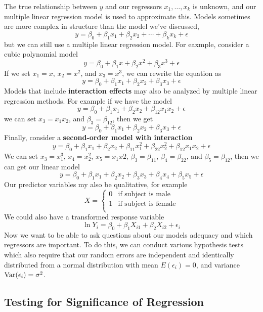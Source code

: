 The true relationship between $y$ and our regressors $x_1,\ldots, x_k$ is unknown, and our multiple linear regression model is used to approximate this. Models sometimes are more complex in structure than the model we've discussed, 
\[y = \beta_0 + \beta_1x_1 + \beta_2x_2 + \cdots + \beta_kx_k + \epsilon\]
but we can still use a multiple linear regression model. For eaxmple, consider a cubic polynomial model 
\[y = \beta_0 + \beta_1x + \beta_2x^2 + \beta_3x^3 + \epsilon\]
If we set $x_1 = x$, $x_2 = x^2$, and $x_3 = x^3$, we can rewrite the equation as 
\[y = \beta_0 + \beta_1x_1 + \beta_2x_2 + \beta_3x_3 + \epsilon\]
Models that include \textbf{interaction effects} may also be analyzed by multiple linear regression methods. For example if we have the model 
\[y = \beta_0 + \beta_1x_1 + \beta_2x_2 + \beta_{12}x_1x_2 + \epsilon\]
we can set $x_3 = x_1x_2$, and $\beta_3 = \beta_{12}$, then we get
\[y = \beta_0 + \beta_1x_1 + \beta_2x_2 + \beta_3x_3 + \epsilon\]
Finally, consider a \textbf{second-order model with interaction}
\[y = \beta_0 + \beta_1x_1 + \beta_2x_2 + \beta_{11}x_1^2 + \beta_{22}x_2^2 + \beta_{12}x_1x_2 + \epsilon\]
We can set $x_3 = x_1^3$, $x_4 = x_2^2$, $x_5 = x_1x2$, $\beta_3 = \beta_{11}$, $\beta_4 = \beta_{22}$, and $\beta_5 = \beta_{12}$, then we can get our linear model 
\[y = \beta_0 + \beta_1x_1 + \beta_2x_2 + \beta_3x_3 + \beta_4x_4 + \beta_5x_5 + \epsilon\]
Our predictor variables my also be qualitative, for example 
\[X = \begin{cases}
    0 & \text{if subject is male}\\
    1 & \text{if subject is female}\\
\end{cases}\]
We could also have a transformed response variable 
\[\ln Y_i = \beta_0 + \beta_1X_{i1} + \beta_2X_{i2} + \epsilon_i\]
Now we want to be able to ask questions about our models adequacy and which regressors are important. To do this, we can conduct various hypothesis tests which also require that our random errors are independent and identically distributed from a normal distribution with mean $E(\epsilon_i) = 0$, and variance $\operatorname{Var}(\epsilon_i) = \sigma^2$.

\subsection{Testing for Significance of Regression}

